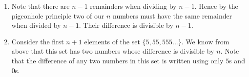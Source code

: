 \begin{mdframed}[linewidth=1]
\begin{enumerate}
    \item Note that there are $n - 1$ remainders when dividing by $n - 1$. Hence by the pigeonhole principle two of our $n$ numbers must have the same remainder when divided by $n - 1$. Their difference is divisible by $n - 1$. 

    \item Consider the first $n + 1$ elements of the set $\{5, 55, 555...\}$. We know from above that this set has two numbers whose difference is divisible by $n$. Note that the difference of any two numbers in this set is written using only $5$s and $0$s.

\end{enumerate}
\end{mdframed}